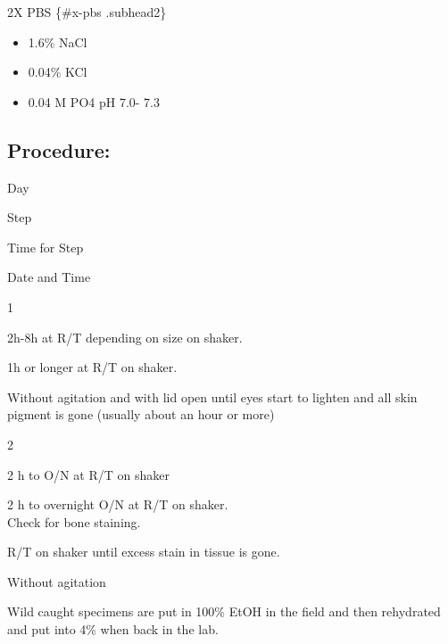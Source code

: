 \documentclass[
]{book}
\providecommand{\tightlist}{%
  \setlength{\itemsep}{0pt}\setlength{\parskip}{0pt}}
\begin{document}
2X PBS \{\#x-pbs .subhead2\}

\begin{itemize}
\tightlist
\item
  1.6\% NaCl
\item
  0.04\% KCl
\item
  0.04 M PO4 pH 7.0- 7.3
\end{itemize}

\hypertarget{procedure-2}{%
\subsection{Procedure:}\label{procedure-2}}

Day

Step

Time for Step

Date and Time

1

2h-8h at R/T depending on size on shaker.

1h or longer at R/T on shaker.

Without agitation and with lid open until eyes start to lighten and all
skin pigment is gone (usually about an hour or more)

2

2 h to O/N at R/T on shaker

2 h to overnight O/N at R/T on shaker.\\
Check for bone staining.

R/T on shaker until excess stain in tissue is gone.

Without agitation

Wild caught specimens are put in 100\% EtOH in the field and then
rehydrated and put into 4\% when back in the lab.

  
\end{document}
